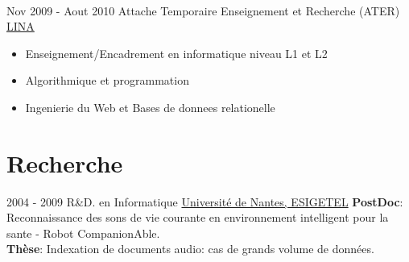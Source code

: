\documentclass[letterpaper]{twentysecondcv} %
\begin{document}
\begin{twenty}
       \\
	\twentyitem
	{Nov 2009 -}
	{Aout 2010}
	{Attache Temporaire Enseignement et Recherche (ATER)}
	{\href{http://www.lina.univ-nantes.fr/}{LINA}}
	{}
	{
		\begin{itemize}
			\item Enseignement/Encadrement en informatique niveau L1 et L2
			\item Algorithmique et programmation
			\item Ingenierie du Web et Bases de donnees relationelle
		\end{itemize}
	}
\end{twenty}

\section{Recherche}
\begin{twenty}
	\twentyitem
    	{2004 - 2009}
		{}
        {R\&D. en Informatique}
        {\href{https://www.univ-nantes.fr/}{Université de Nantes, ESIGETEL}}
        {}
	       {
	        \textbf{PostDoc}: Reconnaissance des sons de vie courante en environnement intelligent pour la sante - Robot CompanionAble. \\
	       	\textbf{Thèse}: Indexation de documents audio: cas de grands volume de données.
	        {
			}
	       }
  
\end{twenty}

\end{document}

